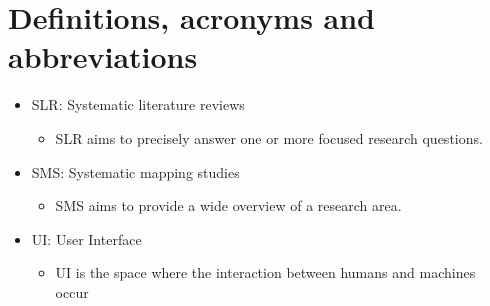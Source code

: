 \section{Definitions, acronyms and abbreviations}

\begin{itemize}
\item SLR: Systematic literature reviews
	\begin{itemize}
		\item SLR aims to precisely answer one or more focused research questions.
	\end{itemize}
\item SMS: Systematic mapping studies
	\begin{itemize}
		\item SMS aims to provide a wide overview of a research area.
	\end{itemize}
\item UI: User Interface
	\begin{itemize}
		\item UI is the space where the interaction between humans and machines occur
	\end{itemize}
\end{itemize}

